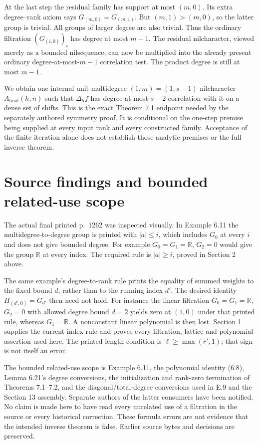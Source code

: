 \documentclass[11pt]{article}
\newcommand{\R}{\mathbb R}\newcommand{\Q}{\mathbb Q}
\begin{document}
At the last step the residual family has support at most $(m,0)$.
Its extra degree--rank axiom says $G_{(m,0)}=G_{(m,1)}$.
But $(m,1)>(m,0)$, so the latter group is trivial. All groups of
larger degree are also trivial. Thus the ordinary filtration
$(G_{(i,0)})_i$ has degree at most $m-1$. The residual nilcharacter,
viewed merely as a bounded nilsequence, can now be multiplied into
the already present ordinary degree-at-most-$m-1$ correlation test.
The product degree is still at most $m-1$.

We obtain one internal unit multidegree $(1,m)=(1,s-1)$ nilcharacter
$A_{\mathrm{final}}(h,n)$ such that $\Delta_h f$ has
degree-at-most-$s-2$ correlation with it on a dense set of shifts.
This is the exact Theorem 7.1 endpoint needed by the separately
authored symmetry proof. It is conditional on the one-step premise
being supplied at every input rank and every constructed family.
Acceptance of the finite iteration alone does not establish those
analytic premises or the full inverse theorem.

\section{Source findings and bounded related-use scope}

The actual final printed p.~1262 was inspected visually. In Example 6.11
the multidegree-to-degree group is printed with $|a|\leq i$, which
includes $G_0$ at every $i$ and does not give bounded degree. For
example $G_0=G_1=\R$, $G_2=0$ would give the group $\R$ at every
index. The required rule is $|a|\geq i$, proved in Section 2 above.

The same example's degree-to-rank rule prints the equality of summed
weights to the fixed bound $d$, rather than to the running index $d'$.
The desired identity $H_{(d',0)}=G_{d'}$ then need not hold. For
instance the linear filtration $G_0=G_1=\R$, $G_2=0$ with allowed
degree bound $d=2$ yields zero at $(1,0)$ under that printed rule,
whereas $G_1=\R$. A nonconstant linear polynomial is then lost.
Section 1 supplies the current-index rule and proves every filtration,
lattice and polynomial assertion used here. The printed length
condition is $\ell\geq\max(r',1)$; that sign is not itself an error.

The bounded related-use scope is Example 6.11, the polynomial identity
(6.8), Lemma 6.21's degree conversions, the initialization and rank-zero
termination of Theorems 7.1--7.2, and the diagonal/total-degree conversions
used in E.9 and the Section 13 assembly. Separate authors of the latter
consumers have been notified. No claim is made here to have read every
unrelated use of a filtration in the source or every historical correction.
These formula errors are not evidence that the intended inverse theorem
is false. Earlier source bytes and decisions are preserved.
\end{document}
